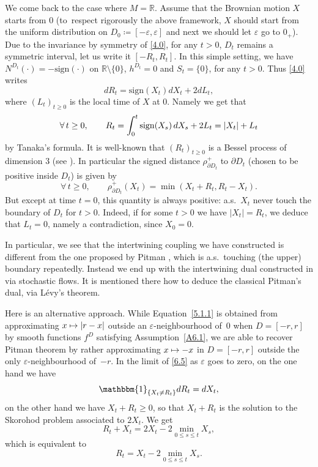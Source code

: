\documentclass[JEP,XML,SOM,Unicode,NoFloatCountersInSection,published]{cedram}
\let\epsilon\varepsilon
\let\backslash\setminus
\newcommand\mto{\mathchoice{\longmapsto}{\mapsto}{\mapsto}{\mapsto}}
\theoremstyle{plain}
\theoremstyle{definition}
\newcommand{\RR}{{\mathbb R}}
\newcommand\df{\coloneqq}
\newcommand{\sign}{\mathrm{sign}}
\newcommand{\bq}{\begin{equation*}}
\newcommand{\eq}{\end{equation*}}
\newcommand{\fo}{\forall\,}
\newcommand{\un}{\mathbbm{1}}
\let\e\varepsilon
\begin{document}
{We come back to} the case where $M=\RR$. Assume that the Brownian motion $X$ starts from 0
(to~respect rigorously the above framework, $X$ should start from the uniform distribution on $D_0\df[-\epsilon,\epsilon]$
and next we should let $\epsilon$ go to $0_+$).
Due to the invariance by symmetry of \eqref{4.0}, for any $t>0$, $D_t$ remains a symmetric interval, let us write it $[-R_t,R_t]$.
In this simple setting, we have $N^{D_t}(\cdot)=-\sign(\cdot)$ on $\RR\backslash{\{0\}}$, $h^{D_t}=0$ and $S_t=\{0\}$, for any $t>0$.
Thus {\eqref{4.0}} writes
\begin{equation}
\label{5.1.1}
dR_t=\sign(X_t)dX_t+2dL_t,
\end{equation}
where $(L_t)_{t\geq 0}$ is the local time of $X$ at 0.
Namely we get that
\bq
\fo t\geq 0,\qquad R_t=\int_0^t\sign(X_s)\,dX_s+2L_t\\
=\vert X_t\vert +L_t
\eq
by Tanaka's formula.
It is well-known that $(R_t)_{t\geq 0}$ is a Bessel process of dimension 3 (see \eg \cite[Chap.\,6, Cor.\,3.8]{MR1725357}).
In particular the signed distance $\rho^+_{\partial D_t}$ to $\partial D_t$ (chosen to be positive inside $D_t$) is given by
\bq
\fo t\geq 0,\qquad \rho^+_{\partial D_t}(X_t)=\min(X_t+R_t, R_t-X_t).\eq
But except at time $t=0$, this quantity is always positive: a.s.\ $X_t$ never touch the boundary of $D_t$ for $t>0$.
Indeed, if for some $t>0$ we have $\vert X_t\vert =R_t$, we deduce that $L_t=0$, namely a contradiction, since $X_0=0$.
\par
In particular, we see that the intertwining coupling we have constructed is different from the one proposed by Pitman \cite{MR0375485},
which is a.s.\ touching (the upper) boundary repeatedly. {Instead we end up with the intertwining dual constructed in \cite{Mic2020} via stochastic flows.
It is mentioned there how to deduce the classical Pitman's dual, via Lévy's theorem.}

Here is an alternative approach.
While Equation~\eqref{5.1.1} is obtained from approximating $x\mto |r-x|$ outside an $\e$-neighbourhood of~$0$ when $D=[-r,r]$ by smooth functions $f^D$ satisfying Assumption~\ref{A6.1},
we are able to recover Pitman theorem by rather approximating $x\mto -x$ in $D=[-r,r]$ outside the only $\e$-neighbourhood of~$-r$.
In the limit of \eqref{6.5} as $\epsilon$ goes to zero, on the one hand we have
\begin{equation}
\un_{\left\{X_t\not=R_t\right\}}dR_t=dX_t,
\end{equation}
on the other hand we have $X_t+R_t\ge 0$, so that $X_t+R_t$ is the solution to the Skorohod problem associated to $2X_t$.
We get
\begin{equation}
R_t+X_t=2X_t-2\min_{0\le s\le t}X_s,
\end{equation}
which is equivalent to
\begin{equation}
R_t=X_t-2\min_{0\le s\le t}X_s.
\end{equation}
\end{document}
